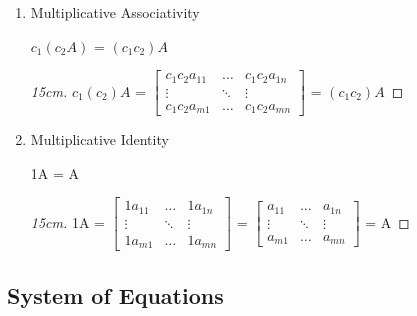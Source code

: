 \begin{enumerate}[label=(\alph*), leftmargin=2cm, itemsep=0.1cm]
        \item {\color{lgreen} Multiplicative Associativity}
        
            \hspace{0.5cm}
            $c_1(c_2A)$ = $(c_1c_2)A$

            \begin{proof}[15cm]
                $c_1(c_2)A$ =
                $\begin{bmatrix}
                    c_1c_2a_{11} & \hdots & c_1c_2a_{1n} \\
                    \vdots & \ddots & \vdots \\
                    c_1c_2a_{m1} & \hdots & c_1c_2a_{mn}
                \end{bmatrix}$
                = $(c_1c_2)A$
            \end{proof}

            \newpage

        \item {\color{lgreen} Multiplicative Identity}
        
            \hspace{0.5cm}
            1A = A

            \begin{proof}[15cm]
                1A =
                $\begin{bmatrix}
                    1a_{11} & \hdots & 1a_{1n} \\
                    \vdots & \ddots & \vdots \\
                    1a_{m1} & \hdots & 1a_{mn}
                \end{bmatrix}$ =
                $\begin{bmatrix}
                    a_{11} & \hdots & a_{1n} \\
                    \vdots & \ddots & \vdots \\
                    a_{m1} & \hdots & a_{mn}
                \end{bmatrix}$
                = A
            \end{proof}
    \end{enumerate}

    \vspace{0.5cm}





\subsection{ System of Equations }

